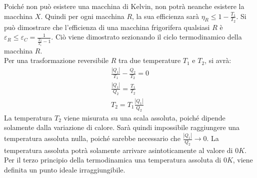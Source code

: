 \documentclass{article}
\numberwithin{equation}{subsection}
\begin{document}
\begin{center}\end{center}

Poiché non può esistere una macchina di Kelvin, non potrà neanche esistere la macchina $X$. Quindi per ogni macchina $R$, la sua efficienza sarà 
$\eta_R\leq1-\displaystyle\frac{T_1}{T_2}$. Si può dimostrare che l'efficienza di una macchina frigorifera qualsiasi $R$ è 
$\varepsilon_R\leq\varepsilon_C=\displaystyle\frac{1}{\displaystyle\frac{T_2}{T_1}-1}$. 
Ciò viene dimostrato sezionando il ciclo termodinamico della macchina $R$. 
\\
Per una trasformazione reversibile $R$ tra due temperature $T_1$ e $T_2$, si avrà:
\begin{gather*}
    \displaystyle\frac{|Q_1|}{T_1}-\frac{Q_2}{T_2}=0\\
    \displaystyle\frac{|Q_1|}{Q_2}=\frac{T_1}{T_2}\\
    T_2=T_1\displaystyle\frac{|Q_1|}{Q_2}
\end{gather*}
La temperatura $T_2$ viene misurata su una scala assoluta, poiché dipende solamente dalla variazione di calore. Sarà quindi impossibile raggiungere 
una temperatura assoluta nulla, poiché sarebbe 
necessario che $\displaystyle\frac{|Q_1|}{Q_2}\to 0$. La temperatura assoluta potrà solamente arrivare asintoticamente al valore di $0K$. 
Per il terzo principio della termodinamica una temperatura assoluta di $0K$, viene definita un punto ideale irraggiungibile. 
\end{document}
